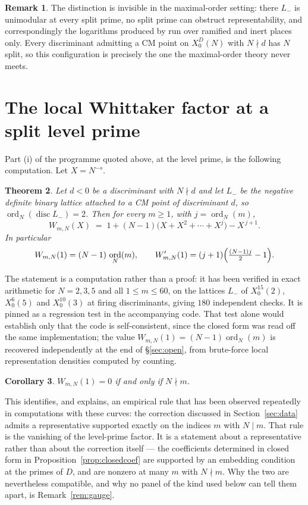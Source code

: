 \documentclass[11pt,reqno]{amsart}
\theoremstyle{plain}
\newtheorem{theorem}{Theorem}[section]
\newtheorem{corollary}[theorem]{Corollary}
\theoremstyle{definition}
\newtheorem{remark}[theorem]{Remark}
\DeclareMathOperator{\ord}{ord}
\DeclareMathOperator{\disc}{disc}
\newcommand{\Lm}{L_{-}}
\begin{document}
\begin{remark}
The distinction is invisible in the maximal-order setting: there $\Lm$ is unimodular at every split
prime, no split prime can obstruct representability, and correspondingly the logarithms produced by
\cite[Theorem 4.1]{Schofer} run over ramified and inert places only. Every discriminant admitting a
CM point on $X_0^D(N)$ with $N\nmid d$ has $N$ split, so this configuration is precisely the one the
maximal-order theory never meets.
\end{remark}

\section{The local Whittaker factor at a split level prime}\label{sec:closed}

Part (i) of the programme quoted above, at the level prime, is the following computation. Let
$X=N^{-s}$.

\begin{theorem}\label{thm:closed}
Let $d<0$ be a discriminant with $N\nmid d$ and let $\Lm$ be the negative definite binary lattice
attached to a CM point of discriminant $d$, so $\ord_N(\disc \Lm)=2$. Then for every $m\ge 1$, with
$j=\ord_N(m)$,
\[
  W_{m,N}(X)\;=\;1+(N-1)\bigl(X+X^2+\cdots+X^{j}\bigr)-X^{\,j+1}.
\]
In particular
\[
  W_{m,N}(1)=(N-1)\,\ord_N(m),
  \qquad
  W_{m,N}'(1)=(j+1)\Bigl(\tfrac{(N-1)j}{2}-1\Bigr).
\]
\end{theorem}

The statement is a computation rather than a proof: it has been verified in exact arithmetic for
$N=2,3,5$ and all $1\le m\le 60$, on the lattices $\Lm$ of $X_0^{15}(2)$, $X_0^{6}(5)$ and
$X_0^{10}(3)$ at firing discriminants, giving $180$ independent checks. It is pinned as a regression
test in the accompanying code. That test alone would establish only that the code is
self-consistent, since the closed form was read off the same implementation; the value
$W_{m,N}(1)=(N-1)\ord_N(m)$ is recovered independently at the end of \S\ref{sec:open}, from
brute-force local representation densities computed by counting.

\begin{corollary}\label{cor:support}
$W_{m,N}(1)=0$ if and only if $N\nmid m$.
\end{corollary}

This identifies, and explains, an empirical rule that has been observed repeatedly in computations
with these curves: the correction discussed in Section~\ref{sec:data} admits a representative
supported exactly on the indices $m$ with $N\mid m$. That rule is the vanishing of the level-prime
factor. It is a statement about a representative rather than about the correction itself --- the
coefficients determined in closed form in Proposition~\ref{prop:closedcoef} are supported by an
embedding condition at the primes of $D$, and are nonzero at many $m$ with $N\nmid m$. Why the two
are nevertheless compatible, and why no panel of the kind used below can tell them apart, is
Remark~\ref{rem:gauge}.
\end{document}
